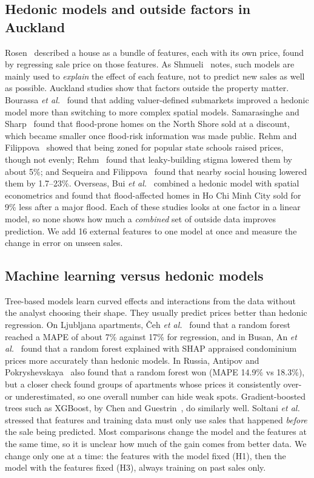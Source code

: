 \documentclass[conference]{IEEEtran}
\begin{document}
\subsection{Hedonic models and outside factors in Auckland}
Rosen~\cite{rosen1974} described a house as a bundle of features, each
with its own price, found by regressing sale price on those features.
As Shmueli~\cite{shmueli2010} notes, such models are mainly used to
\emph{explain} the effect of each feature, not to predict new sales as
well as possible. Auckland studies show that factors outside the
property matter. Bourassa \textit{et al.}~\cite{bourassa2007} found that
adding valuer-defined submarkets improved a hedonic model more than
switching to more complex spatial models. Samarasinghe and
Sharp~\cite{samarasinghe2010} found that flood-prone homes on the North
Shore sold at a discount, which became smaller once flood-risk
information was made public. Rehm and Filippova~\cite{rehm2008} showed
that being zoned for popular state schools raised prices, though not
evenly; Rehm~\cite{rehm2009} found that leaky-building stigma lowered
them by about 5\%; and Sequeira and Filippova~\cite{sequeira2021} found
that nearby social housing lowered them by 1.7--23\%. Overseas, Bui
\textit{et al.}~\cite{bui2024} combined a hedonic model with spatial
econometrics and found that flood-affected homes in Ho Chi Minh City
sold for 9\% less after a major flood. Each of these studies looks at one factor in a
linear model, so none shows how much a \emph{combined} set of outside
data improves prediction. We add 16 external features to one model at
once and measure the change in error on unseen sales.

\subsection{Machine learning versus hedonic models}
Tree-based models learn curved effects and interactions from the data
without the analyst choosing their shape. They usually predict prices
better than hedonic regression. On Ljubljana apartments, \v{C}eh
\textit{et al.}~\cite{ceh2018} found that a random forest reached a MAPE
of about 7\% against 17\% for regression, and in Busan, An
\textit{et al.}~\cite{an2025} found that a random forest explained with
SHAP appraised condominium prices more accurately than hedonic models.
In Russia, Antipov and Pokryshevskaya~\cite{antipov2012} also found that
a random forest won (MAPE 14.9\% vs 18.3\%), but a closer check found
groups of apartments whose prices it consistently over- or
underestimated, so one overall number can hide weak spots.
Gradient-boosted trees such as XGBoost, by Chen and
Guestrin~\cite{chen2016xgboost}, do similarly well. Soltani
\textit{et al.}~\cite{soltani2022} stressed that features and training
data must only use sales that happened \emph{before} the sale being
predicted. Most comparisons change the model and the features at the
same time, so it is unclear how much of the gain comes from better data.
We change only one at a time: the features with the model fixed (H1),
then the model with the features fixed (H3), always training on past
sales only.
\end{document}
